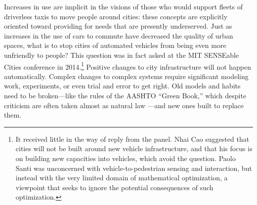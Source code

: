 
Increases in use are
implicit in the visions of those who would support fleets of
driverless taxis to move people around cities:  these concepts are
explicitly oriented toward providing for needs that are presently
underserved. Just as increases in the use of cars to commute have
decreased the quality of urban spaces, what is to stop cities of
automated vehicles from
being even more unfriendly to
people? This question was in fact asked at the MIT SENSEable Cities
conference in 2014.\footnote{It received little in the way of reply from the
panel. Nhai Cao suggested that cities will not be built around new
vehicle infrastructure, and that his focus is on building new
capacities into vehicles, which avoid the question. Paolo Santi was
unconcerned with vehicle-to-pedestrian sensing and interaction, but
instead with the very limited domain of mathematical optimization,
a viewpoint that seeks to ignore the potential consequences of such
optimization.} Positive changes to city infrastructure will not happen
automatically. Complex
changes to complex systems require significant modeling work,
experiments, or even trial and error to get right. Old models and
habits need to be broken---like the rules of the AASHTO ``Green
Book,'' which despite criticism are often taken almost as natural 
law \cite[p. 181, 183]{swopeTrenton}---and new ones built to replace them. 

